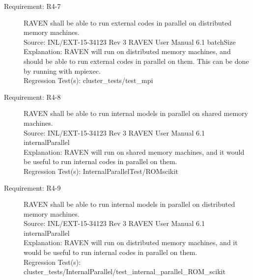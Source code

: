 \documentclass{article}
\newcommand{\requirement}[5]{\item[Requirement: #1] #2 \\Source: #3\\Explanation: #4\\Regression Test(s): #5}
\begin{document}
\begin{description}
\requirement{R4-7}{RAVEN shall be able to run external codes in parallel on distributed memory machines.}
{INL/EXT-15-34123 Rev 3 RAVEN User Manual 6.1 batchSize}
{RAVEN will run on distributed memory machines, and should be able to run external codes in parallel on them.  This can be done by running with mpiexec.}
{cluster\_tests/test\_mpi}

\requirement{R4-8}{RAVEN shall be able to run internal models in parallel on shared memory machines.}
{INL/EXT-15-34123 Rev 3 RAVEN User Manual 6.1 internalParallel}
{RAVEN will run on shared memory machines, and it would be useful to run internal codes in parallel on them.}
{InternalParallelTest/ROMscikit}

\requirement{R4-9}{RAVEN shall be able to run internal models in parallel on distributed memory machines.}
{INL/EXT-15-34123 Rev 3 RAVEN User Manual 6.1 internalParallel}
{RAVEN will run on distributed memory machines, and it would be useful to run internal codes in parallel on them.}
{cluster\_tests/InternalParallel/test\_internal\_parallel\_ROM\_scikit}

\end{description}
\end{document}
